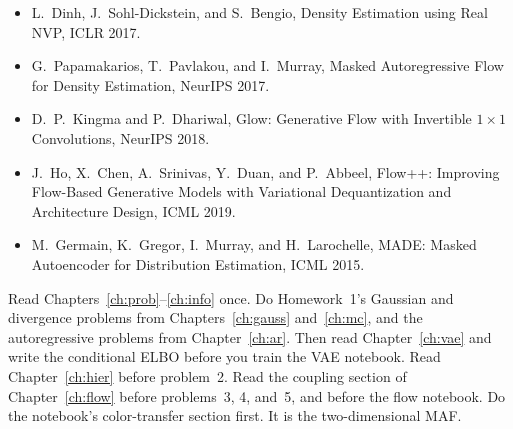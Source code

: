 \begin{itemize}[leftmargin=1.2em]
\item L.\ Dinh, J.\ Sohl-Dickstein, and S.\ Bengio, Density Estimation using Real NVP, ICLR 2017.
\item G.\ Papamakarios, T.\ Pavlakou, and I.\ Murray, Masked Autoregressive Flow for Density Estimation, NeurIPS 2017.
\item D.\ P.\ Kingma and P.\ Dhariwal, Glow: Generative Flow with Invertible $1\times 1$ Convolutions, NeurIPS 2018.
\item J.\ Ho, X.\ Chen, A.\ Srinivas, Y.\ Duan, and P.\ Abbeel, Flow++: Improving Flow-Based Generative Models with Variational Dequantization and Architecture Design, ICML 2019.
\item M.\ Germain, K.\ Gregor, I.\ Murray, and H.\ Larochelle, MADE: Masked Autoencoder for Distribution Estimation, ICML 2015.
\end{itemize}

\begin{intbox}
Read Chapters~\ref{ch:prob}--\ref{ch:info} once. Do Homework~1's Gaussian and divergence problems from Chapters~\ref{ch:gauss} and~\ref{ch:mc}, and the autoregressive problems from Chapter~\ref{ch:ar}. Then read Chapter~\ref{ch:vae} and write the conditional ELBO before you train the VAE notebook. Read Chapter~\ref{ch:hier} before problem~2. Read the coupling section of Chapter~\ref{ch:flow} before problems~3, 4, and~5, and before the flow notebook. Do the notebook's color-transfer section first. It is the two-dimensional MAF.
\end{intbox}
